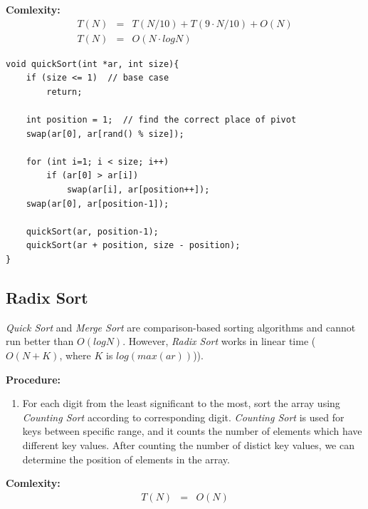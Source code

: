 \documentclass[12pt]{article}
\begin{document}
\textbf{Comlexity: }
\begin{eqnarray*}
	T(N) &=& T(N / 10) + T(9\cdot N / 10) + O(N) \\
	T(N) &=& O(N \cdot logN)
\end{eqnarray*}
		
\begin{verbatim}
void quickSort(int *ar, int size){
    if (size <= 1)  // base case
        return;
	
    int position = 1;  // find the correct place of pivot
    swap(ar[0], ar[rand() % size]);
	
    for (int i=1; i < size; i++)
        if (ar[0] > ar[i])
            swap(ar[i], ar[position++]);
    swap(ar[0], ar[position-1]);
	
    quickSort(ar, position-1);
    quickSort(ar + position, size - position);
}
\end{verbatim}

\cleardoublepage
		\subsection{Radix Sort}

	\textit{Quick Sort} and \textit{Merge Sort} are comparison-based sorting algorithms and cannot run better than $O(log N)$. However, \textit{Radix Sort} works in linear time ($O(N + K)$, where $K$ is $log(max(ar))$)).

\textbf{Procedure: }
\begin{enumerate}
	\item For each digit from the least significant to the most, sort the array using \textit{Counting Sort} according to corresponding digit. \textit{Counting Sort} is used for keys between specific range, and it counts the number of elements which have different key values. After counting the number of distict key values, we can determine the position of elements in the array. 
\end{enumerate}	

\textbf{Comlexity: }
\begin{eqnarray*}
	T(N) &=& O(N)
\end{eqnarray*}
\end{document}
